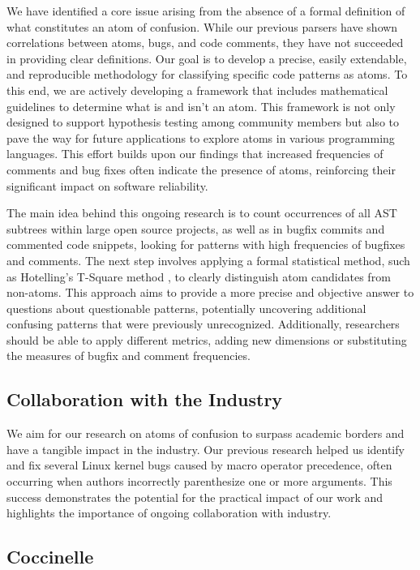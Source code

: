 \documentclass[conference]{IEEEtran}
\begin{document}
We have identified a core issue arising from the absence of a 
formal definition of what constitutes an atom of confusion. 
While our previous parsers \cite{gopstein2018prevalence} 
have shown correlations between atoms, bugs, and 
code comments, they have not succeeded in providing clear 
definitions. Our goal is to develop a precise, easily 
extendable, and reproducible methodology for classifying 
specific code patterns as atoms. To this end, we are actively 
developing a framework that includes mathematical guidelines 
to determine what is and isn't an atom. This framework is not 
only designed to support hypothesis testing among community 
members but also to pave the way for future applications to 
explore atoms in various programming languages. This effort 
builds upon our findings that increased frequencies of 
comments and bug fixes often indicate the presence of atoms, 
reinforcing their significant impact on software reliability.

The main idea behind this ongoing research is to count 
occurrences of all AST subtrees within large open source 
projects, as well as in bugfix commits and commented code 
snippets, looking for patterns with high frequencies of 
bugfixes and comments. The next step involves applying a formal statistical method, such as Hotelling’s T-Square method \cite{hotelling1931}, to clearly distinguish atom candidates from non-atoms. This approach aims 
to provide a more precise and objective answer to questions 
about questionable patterns, potentially uncovering additional 
confusing patterns that were previously unrecognized. 
Additionally, researchers should be able to apply different 
metrics, adding new dimensions or substituting the measures of 
bugfix and comment frequencies.


\subsection{Collaboration with the Industry}

We aim for our research on atoms of confusion to surpass 
academic borders and have a tangible impact in the industry. 
Our previous research helped us identify and fix several Linux kernel bugs caused by macro operator precedence, often occurring when authors incorrectly parenthesize one or more arguments. This success demonstrates 
the potential for the practical impact of our work and 
highlights the importance of ongoing collaboration with 
industry.

\subsection{Coccinelle}
\end{document}
